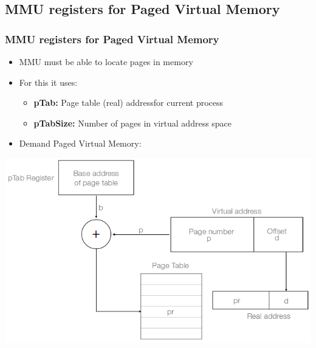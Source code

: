 \documentclass{beamer}
\begin{document}
\subsection{MMU registers for Paged Virtual Memory}
\begin{frame}
\frametitle{MMU registers for Paged Virtual Memory}
\begin{itemize}
\item MMU must be able to locate pages in memory
\item For this it uses:
\begin{itemize}
\item \textbf{pTab:} Page table (real) addressfor current process
\item \textbf{pTabSize:} Number of pages in virtual address space
\end{itemize}
\item Demand Paged Virtual Memory:
\end{itemize}
\includegraphics[scale=.3]{deman.png}
\end{frame}
\end{document}
